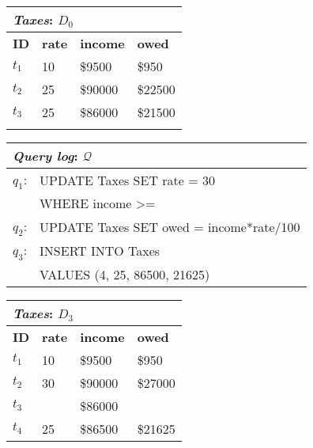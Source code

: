 

\begin{figure*}[t]
    \begin{minipage}[t]{0.28\textwidth}
         \vspace{0pt} 
         \centering
        \begin{tabular}{llll}
            \multicolumn{4}{l}{\emph{Taxes}: $D_0$}\\
            \toprule
            \textbf{ID}  & \textbf{rate}  & \textbf{income}    & \textbf{owed}\\
            \midrule
            $t_1$   & 10    & \$9500    & \$950\\
            $t_2$   & 25    & \$90000   & \$22500\\
            $t_3$   & 25    & \$86000   & \$21500\\
            \bottomrule
            \\
        \end{tabular}
    \end{minipage}
    \begin{minipage}[t]{0.43\textwidth}
         \vspace{0pt} 
         \centering
        \begin{tabular}{|p{1ex}l|}
            \multicolumn{2}{l}{\emph{Query log}: $\mathcal{Q}$}\\
            \hline
            $q_1$: & {\small UPDATE Taxes SET rate = 30}\\
                   & {\small WHERE income >= \color{red}{85700}} \\
            
            $q_2$: & {\small UPDATE Taxes SET owed = income*rate/100}\\
            
            $q_3$: & {\small INSERT INTO Taxes}\\ &{\small VALUES (4, 25, 86500, 21625)}\\
            \hline
        \end{tabular}
    \end{minipage}
    \begin{minipage}[t]{0.28\textwidth}
         \vspace{0pt} 
         \centering
        \begin{tabular}{llll}
            \multicolumn{4}{l}{\emph{Taxes}: $D_3$}\\
            \toprule
            \textbf{ID}  & \textbf{rate}  & \textbf{income}    & \textbf{owed}\\
            \midrule
            $t_1$   & 10    & \$9500    & \$950\\
            $t_2$   & 30    & \$90000   & \$27000\\
            \rowcolor{mid-gray}
            $t_3$   & \color{red}{30}    & \$86000   & \color{red}{\$25800}\\
            $t_4$   & 25    & \$86500   & \$21625\\
            \bottomrule
        \end{tabular}
    \end{minipage}


\end{figure*}

